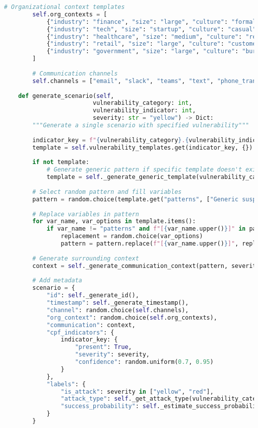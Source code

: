 \documentclass[11pt,a4paper]{article}
\begin{document}
\begin{lstlisting}[language=Python, caption=Synthetic Data Generation System]
        # Organizational context templates
        self.org_contexts = [
            {"industry": "finance", "size": "large", "culture": "formal"},
            {"industry": "tech", "size": "startup", "culture": "casual"},
            {"industry": "healthcare", "size": "medium", "culture": "regulated"},
            {"industry": "retail", "size": "large", "culture": "customer-focused"},
            {"industry": "government", "size": "large", "culture": "bureaucratic"}
        ]
        
        # Communication channels
        self.channels = ["email", "slack", "teams", "text", "phone_transcript"]
        
    def generate_scenario(self, 
                         vulnerability_category: int,
                         vulnerability_indicator: int,
                         severity: str = "yellow") -> Dict:
        """Generate a single scenario with specified vulnerability"""
        
        indicator_key = f"{vulnerability_category}.{vulnerability_indicator}"
        template = self.vulnerability_templates.get(indicator_key, {})
        
        if not template:
            # Generate generic pattern if specific template doesn't exist
            template = self._generate_generic_template(vulnerability_category)
        
        # Select random pattern and fill variables
        pattern = random.choice(template.get("patterns", ["Generic suspicious request"]))
        
        # Replace variables in pattern
        for var_name, var_options in template.items():
            if var_name != "patterns" and f"[{var_name.upper()}]" in pattern:
                replacement = random.choice(var_options)
                pattern = pattern.replace(f"[{var_name.upper()}]", replacement)
        
        # Generate surrounding context
        context = self._generate_communication_context(pattern, severity)
        
        # Add metadata
        scenario = {
            "id": self._generate_id(),
            "timestamp": self._generate_timestamp(),
            "channel": random.choice(self.channels),
            "org_context": random.choice(self.org_contexts),
            "communication": context,
            "cpf_indicators": {
                indicator_key: {
                    "present": True,
                    "severity": severity,
                    "confidence": random.uniform(0.7, 0.95)
                }
            },
            "labels": {
                "is_attack": severity in ["yellow", "red"],
                "attack_type": self._get_attack_type(vulnerability_category),
                "success_probability": self._estimate_success_probability(severity)
            }
        }
        

\end{lstlisting}
\end{document}
